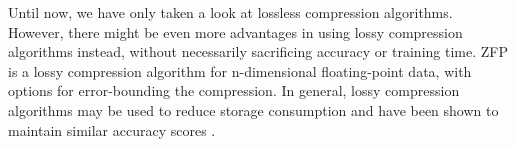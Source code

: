\documentclass[sigconf,nonacm]{acmart}
\begin{document}
Until now, we have only taken a look at lossless compression algorithms.
However, there might be even more advantages in using lossy compression algorithms instead, without necessarily sacrificing accuracy or training time.
ZFP \cite{lindstorm2014fixedrate} is a lossy compression algorithm for n-dimensional floating-point data, with options for error-bounding the compression.
In general, lossy compression algorithms may be used to reduce storage consumption and have been shown to maintain similar accuracy scores \cite{liu2018deepn-jpeg, dodge2016understanding}.



\end{document}
